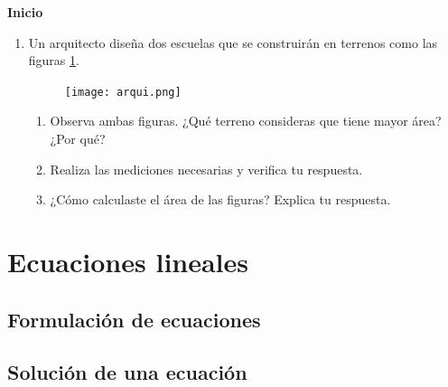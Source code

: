 \documentclass[11pt]{book}
\begin{document}
\begin{boxK}
  \begin{center}\textbf{Inicio}\end{center}

  \begin{enumerate}
    \item Un arquitecto diseña dos escuelas que se construirán en terrenos como las figuras \ref{fig:arqui}.
          \begin{figure}[H]
            \centering
            \texttt{[image: arqui.png]}
            \label{fig:arqui}
          \end{figure}
          \begin{enumerate}
            \item Observa ambas figuras. ¿Qué terreno consideras que tiene mayor área? ¿Por qué?
            \item Realiza las mediciones necesarias y verifica tu respuesta.
            \item ¿Cómo calculaste el área de las figuras? Explica tu respuesta.
          \end{enumerate}
  \end{enumerate}
\end{boxK}















\newpage \thispagestyle{plain}
\section{Ecuaciones lineales}


\subsection{Formulación de ecuaciones}

\subsection{Solución de una ecuación}




\newpage \thispagestyle{plain}
\end{document}
